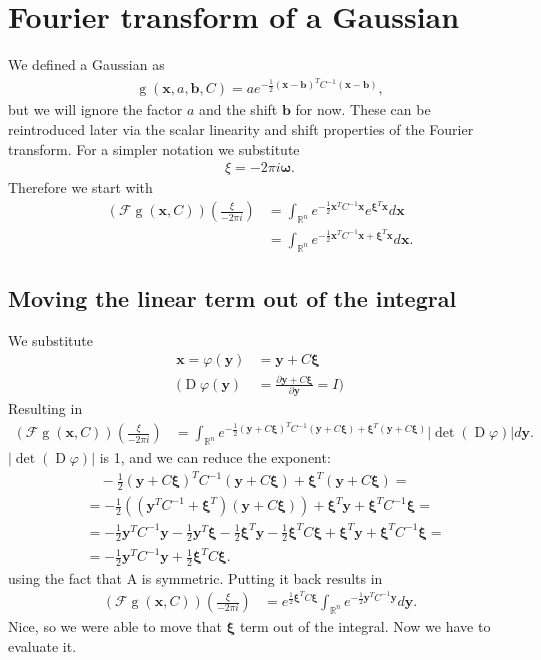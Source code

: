 \documentclass{paper}
\newcommand{\abs}[1]{\left| #1 \right|}
\newcommand{\F}{\ensuremath{\mathcal{F}}}
\newcommand{\vr}[1]{\ensuremath{\boldsymbol{#1}}}
\newcommand{\f}[1]{\operatorname{#1}}
\newcommand{\omegavec}[0]{\ensuremath{\vr{\omega{}}}}
\newcommand{\xivec}[0]{\ensuremath{\vr{\xi{}}}}
\newcommand{\yvec}[0]{\ensuremath{\vr{y}}}
\begin{document}
\section{Fourier transform of a Gaussian}
We defined a Gaussian as 
\begin{align*}
	\f{g}(\vr{x}, a, \vr{b}, C) = a e^{-\frac{1}{2}(\vr{x}-\vr{b})^T C^{-1}(\vr{x}-\vr{b})},
\end{align*}
but we will ignore the factor $a$ and the shift $\vr{b}$ for now.
These can be reintroduced later via the scalar linearity and shift properties of the Fourier transform.
For a simpler notation we substitute
\begin{align*}
	\xi = -2 \pi i \omegavec.
\end{align*}
Therefore we start with
\begin{align*}
	(\F\f{g}(\vr{x}, C))(\frac{\xi}{-2 \pi i}) &= \int_{\mathbb{R}^n} e^{-\frac{1}{2} \vr{x}^T C^{-1} \vr{x}} e^{\vr{\xi}^T \vr{x}} d\vr{x} \\
	&= \int_{\mathbb{R}^n} e^{-\frac{1}{2} \vr{x}^T C^{-1} \vr{x} + \vr{\xi}^T \vr{x}} d\vr{x}.
\end{align*}

\subsection*{Moving the linear term out of the integral}
We substitute
\begin{align*}
	\vr{x} = \varphi(\vr{y}) &= \vr{y} + C\vr{\xi} \\
	\Bigg( \f{D}\varphi(\yvec) &= \frac{\partial \vr{y} + C\vr{\xi}}{\partial \vr{y}} = I \Bigg)
\end{align*}
Resulting in
\begin{align*}
	(\F\f{g}(\vr{x}, C))(\frac{\xi}{-2 \pi i})
	&= \int_{\mathbb{R}^n} e^{-\frac{1}{2} (\yvec + C\xivec)^T C^{-1} (\yvec + C\xivec) + \xivec^T (\yvec + C\xivec)} \abs{\f{det}(\f{D}\varphi)} d\yvec.
\end{align*}
$\abs{\f{det}(\f{D}\varphi)}$ is 1, and we can reduce the exponent:
\begin{align*}
	&\quad -\frac{1}{2} (\yvec + C\xivec)^T C^{-1} (\yvec + C\xivec) + \xivec^T (\yvec + C\xivec) = \\
	&= -\frac{1}{2} \left( (\yvec^T C^{-1} + \xivec^T)(\yvec + C \xivec) \right) + \xivec^T \yvec + \xivec^T C^{-1} \xivec = \\
	&= -\frac{1}{2} \yvec^T C^{-1} \yvec - \frac{1}{2} \yvec^T \xivec -\frac{1}{2} \xivec^T \yvec -\frac{1}{2} \xivec^T C \xivec + \xivec^T \yvec + \xivec^T C^{-1} \xivec = \\
	&= -\frac{1}{2} \yvec^T C^{-1} \yvec + \frac{1}{2} \xivec^T C \xivec.
\end{align*}
using the fact that A is symmetric.
Putting it back results in
\begin{align}
	\label{eq:fourier_only_gauss_int_left}
	(\F\f{g}(\vr{x}, C))(\frac{\xi}{-2 \pi i})
	&= e^{\frac{1}{2} \xivec^T C \xivec} \int_{\mathbb{R}^n} e^{-\frac{1}{2} \yvec^T C^{-1} \yvec}  d\yvec.
\end{align}
Nice, so we were able to move that $\xivec$ term out of the integral.
Now we have to evaluate it.
\end{document}
